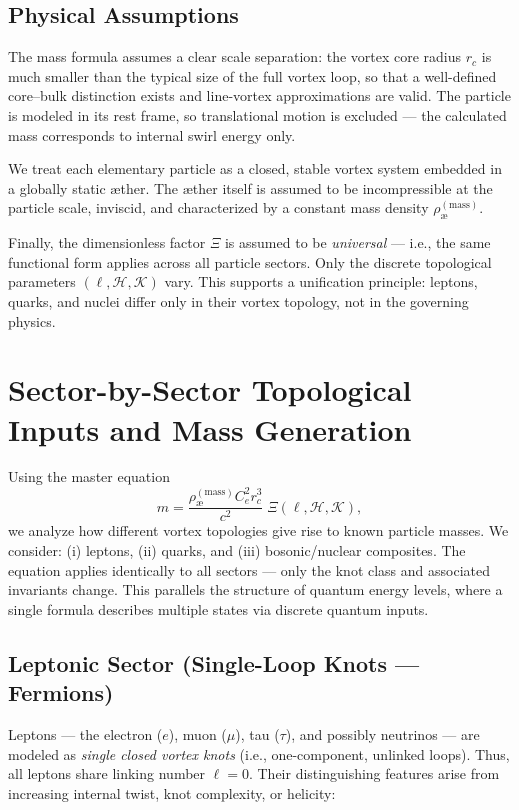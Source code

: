 \documentclass[11pt]{article}
\begin{document}
\subsection{Physical Assumptions}

The mass formula assumes a clear scale separation: the vortex core radius $r_c$ is much smaller than the typical size of the full vortex loop, so that a well-defined core–bulk distinction exists and line-vortex approximations are valid. The particle is modeled in its rest frame, so translational motion is excluded — the calculated mass corresponds to internal swirl energy only.

We treat each elementary particle as a closed, stable vortex system embedded in a globally static æther. The æther itself is assumed to be incompressible at the particle scale, inviscid, and characterized by a constant mass density $\rho_{\text{\ae}}^{(\mathrm{mass})}$.

Finally, the dimensionless factor $\Xi$ is assumed to be \textit{universal} — i.e., the same functional form applies across all particle sectors. Only the discrete topological parameters $(\ell, \mathcal{H}, \mathcal{K})$ vary. This supports a unification principle: leptons, quarks, and nuclei differ only in their vortex topology, not in the governing physics.

\section*{Sector-by-Sector Topological Inputs and Mass Generation}

Using the master equation
\[
    m = \frac{\rho_{\text{\ae}}^{(\mathrm{mass})} C_e^2 r_c^3}{c^2} \; \Xi(\ell, \mathcal{H}, \mathcal{K}),
\]
we analyze how different vortex topologies give rise to known particle masses. We consider: (i) leptons, (ii) quarks, and (iii) bosonic/nuclear composites. The equation applies identically to all sectors — only the knot class and associated invariants change. This parallels the structure of quantum energy levels, where a single formula describes multiple states via discrete quantum inputs.

\subsection{Leptonic Sector (Single-Loop Knots — Fermions)}

Leptons — the electron ($e$), muon ($\mu$), tau ($\tau$), and possibly neutrinos — are modeled as \textit{single closed vortex knots} (i.e., one-component, unlinked loops). Thus, all leptons share linking number $\ell = 0$. Their distinguishing features arise from increasing internal twist, knot complexity, or helicity:
\end{document}
